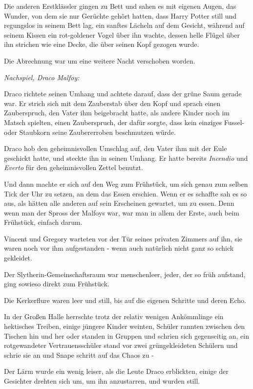 {Die anderen Erstklässler gingen zu Bett und sahen es mit eigenen Augen, das Wunder, von dem sie nur Gerüchte gehört hatten, dass Harry Potter still und regungslos in seinem Bett lag, ein sanftes Lächeln auf dem Gesicht, während auf seinem Kissen ein rot-goldener Vogel über ihn wachte, dessen helle Flügel über ihn strichen wie eine Decke, die über seinen Kopf gezogen wurde.

Die Abrechnung war um eine weitere Nacht verschoben worden.

\emph{\emph{Nachspiel, Draco Malfoy:}}

Draco richtete seinen Umhang und achtete darauf, dass der grüne Saum gerade war. Er strich sich mit dem Zauberstab über den Kopf und sprach einen Zauberspruch, den Vater ihm beigebracht hatte, als andere Kinder noch im Matsch spielten, einen Zauberspruch, der dafür sorgte, dass kein einziges Fussel- oder Staubkorn seine Zaubererroben beschmutzen würde.

Draco hob den geheimnisvollen Umschlag auf, den Vater ihm mit der Eule geschickt hatte, und steckte ihn in seinen Umhang. Er hatte bereits \emph{Incendio} und \emph{Everto} für den geheimnisvollen Zettel benutzt.

Und dann machte er sich auf den Weg zum Frühstück, um sich genau zum selben Tick der Uhr zu setzen, an dem das Essen erschien. Wenn er es schaffte sah es so aus, als hätten alle anderen auf sein Erscheinen gewartet, um zu essen. Denn wenn man der Spross der Malfoys war, war man in allem der Erste, auch beim Frühstück, einfach darum.

Vincent und Gregory warteten vor der Tür seines privaten Zimmers auf ihn, sie waren noch vor ihm aufgestanden - wenn auch natürlich nicht ganz so schick gekleidet.

Der Slytherin-Gemeinschaftsraum war menschenleer, jeder, der so früh aufstand, ging sowieso direkt zum Frühstück.

Die Kerkerflure waren leer und still, bis auf die eigenen Schritte und deren Echo.

In der Großen Halle herrschte trotz der relativ wenigen Ankömmlinge ein hektisches Treiben, einige jüngere Kinder weinten, Schüler rannten zwischen den Tischen hin und her oder standen in Gruppen und schrien sich gegenseitig an, ein rotgewandeter Vertrauensschüler stand vor zwei grüngekleideten Schülern und schrie sie an und Snape schritt auf das Chaos zu -

Der Lärm wurde ein wenig leiser, als die Leute Draco erblickten, einige der Gesichter drehten sich um, um ihn anzustarren, und wurden still.

}
